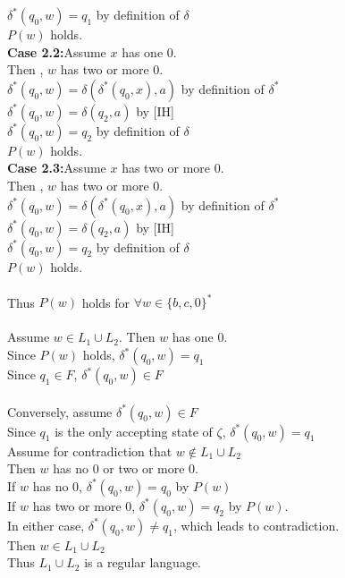\documentclass{article}
\begin{document}
\begin{enumerate}
     $\delta^\ast(q_0, w) = q_1$ by definition of $\delta$\\
    $P(w)$ holds.\\
    \textbf{Case 2.2:}Assume $x$ has one 0.\\
    Then , $w$ has two or more 0.\\
    $\delta^\ast(q_0, w) = \delta(\delta^\ast(q_0, x), a)$ by definition of $\delta^\ast$\\
    $\delta^\ast(q_0, w) = \delta(q_2, a)$ by [IH]\\
    $\delta^\ast(q_0, w) = q_2$ by definition of $\delta$\\
    $P(w)$ holds.\\
    \textbf{Case 2.3:}Assume $x$ has two or more 0.\\
    Then , $w$ has two or more 0.\\
    $\delta^\ast(q_0, w) = \delta(\delta^\ast(q_0, x), a)$ by definition of $\delta^\ast$\\
    $\delta^\ast(q_0, w) = \delta(q_2, a)$ by [IH]\\
    $\delta^\ast(q_0, w) = q_2$ by definition of $\delta$\\
    $P(w)$ holds.\\\\
    Thus $P(w)$ holds for $\forall w \in \{b,c,0\}^\ast$ \\\\
    Assume $w \in L_1\cup L_2$. Then $w$ has one 0.\\
    Since $P(w)$ holds, $\delta^\ast(q_0, w) = q_1$\\
    Since $q_1 \in F$, $\delta^\ast(q_0, w) \in F$\\\\
    Conversely, assume $\delta^\ast(q_0, w) \in F$\\
    Since $q_1$ is the only accepting state of $\zeta$, $\delta^\ast(q_0, w) = q_1$\\
    Assume for contradiction that $w \notin L_1\cup L_2$\\
    Then $w$ has no 0 or two or more 0.\\
    If $w$ has no 0, $\delta^\ast(q_0, w) = q_0$ by $P(w)$\\
    If $w$ has two or more 0, $\delta^\ast(q_0, w) = q_2$ by $P(w)$.\\
    In either case, $\delta^\ast(q_0, w) \neq q_1$, which leads to contradiction.\\
    Then $w \in L_1\cup L_2$\\
    Thus $L_1\cup L_2$ is a regular language.\\

\end{enumerate}
\end{document}
